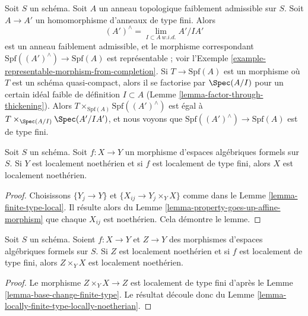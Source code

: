 \begin{example}
\label{example-finite-type-from-finite-type-ring-map}
Soit $S$ un schéma. Soit $A$ un anneau topologique faiblement admissible sur $S$.
Soit $A \to A'$ un homomorphisme d'anneaux de type fini. Alors
$$
(A')^\wedge = \lim_{I \subset A\ w.i.d.} A'/IA'
$$
est un anneau faiblement admissible, et le morphisme correspondant
$\text{Spf}((A')^\wedge) \to \text{Spf}(A)$ est représentable ;
voir l'Exemple \ref{example-representable-morphism-from-completion}.
Si $T \to \text{Spf}(A)$ est un morphisme où $T$ est un schéma
quasi-compact, alors il se factorise par $\Spec(A/I)$ pour un certain idéal faible
de définition $I \subset A$ (Lemme \ref{lemma-factor-through-thickening}).
Alors $T \times_{\text{Spf}(A)} \text{Spf}((A')^\wedge)$
est égal à $T \times_{\Spec(A/I)} \Spec(A'/IA')$, et
nous voyons que $\text{Spf}((A')^\wedge) \to \text{Spf}(A)$ est
de type fini.
\end{example}

\begin{lemma}
\label{lemma-locally-finite-type-locally-noetherian}
Soit $S$ un schéma. Soit $f : X \to Y$ un morphisme d'espaces algébriques
formels sur $S$. Si $Y$ est localement noethérien et si
$f$ est localement de type fini, alors $X$ est localement noethérien.
\end{lemma}

\begin{proof}
Choisissons $\{Y_j \to Y\}$ et $\{X_{ij} \to Y_j \times_Y X\}$
comme dans le Lemme \ref{lemma-finite-type-local}. Il résulte alors
du Lemme \ref{lemma-property-goes-up-affine-morphism}
que chaque $X_{ij}$ est noethérien. Cela démontre le lemme.
\end{proof}

\begin{lemma}
\label{lemma-fibre-product-Noetherian}
Soit $S$ un schéma. Soient $f : X \to Y$ et $Z \to Y$ des morphismes
d'espaces algébriques formels sur $S$. Si $Z$ est localement
noethérien et si $f$ est localement de type fini, alors
$Z \times_Y X$ est localement noethérien.
\end{lemma}

\begin{proof}
Le morphisme $Z \times_Y X \to Z$ est localement de type fini d'après le
Lemme \ref{lemma-base-change-finite-type}. Le résultat découle donc
du Lemme \ref{lemma-locally-finite-type-locally-noetherian}.
\end{proof}








